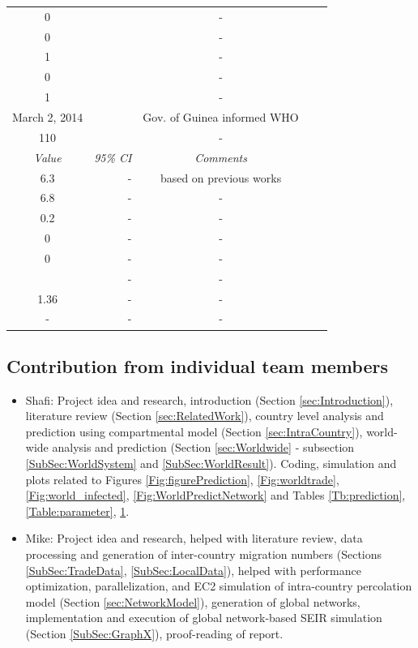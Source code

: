 \documentclass[10pt, journal,onecolumn]{IEEEtran}
\begin{document}
\begin{appendix}
\begin{table}[h]
{\begin{tabular}{@{}crccc@{}}
 0& & -\\
 0& & -\\
 1& & -\\
 0& & -\\
 1& &-\\
 March 2, 2014 &  & Gov. of Guinea informed WHO\\
110 & & -\\
\midrule
 \textit{Value} & \textit{95\% CI} & \textit{Comments} \\
\midrule
6.3 & - & based on previous works \cite{}\\
6.8 & - & -\\
0.2 & - & -\\
0 & - & -\\
0 & - & -\\
 & - & -\\
1.36 &- &-\\
- & - &-\\
\end{tabular}
}
\label{Table:parameter2}
\end{table}




\subsection*{Contribution from individual team members}
{\small
\begin{itemize}
\item{Shafi: } Project idea and research, introduction (Section \ref{sec:Introduction}), literature review (Section \ref{sec:RelatedWork}), country level analysis and prediction using compartmental model (Section \ref{sec:IntraCountry}), world-wide analysis and prediction (Section \ref{sec:Worldwide} - subsection \ref{SubSec:WorldSystem} and \ref{SubSec:WorldResult}). Coding, simulation and plots related to Figures \ref{Fig:figurePrediction}, \ref{Fig:worldtrade}, \ref{Fig:world_infected}, \ref{Fig:WorldPredictNetwork} and Tables \ref{Tb:prediction}, \ref{Table:parameter}, \ref{Table:parameter2}.

\item{Mike: } Project idea and research, helped with literature review, data processing and generation of inter-country migration numbers (Sections \ref{SubSec:TradeData}, \ref{SubSec:LocalData}), helped with performance optimization, parallelization, and EC2 simulation of intra-country percolation model (Section \ref{sec:NetworkModel}), generation of global networks, implementation and execution of global network-based SEIR simulation (Section \ref{SubSec:GraphX}), proof-reading of report.


\end{itemize}}
\end{appendix}
\end{document}
